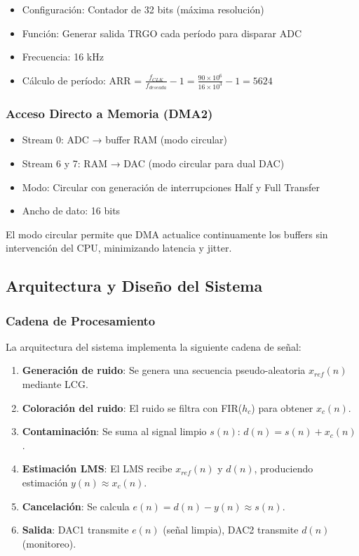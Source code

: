 \documentclass[12pt]{article}
\begin{document}
				\begin{itemize}
					\item Configuración: Contador de 32 bits (máxima resolución)
					\item Función: Generar salida TRGO cada período para disparar ADC
					\item Frecuencia: 16 kHz
					\item Cálculo de período: ARR = $\frac{f_{CLK}}{f_{deseada}} - 1 = \frac{90 \times 10^6}{16 \times 10^3} - 1 = 5624$
				\end{itemize}

			\subsubsection{Acceso Directo a Memoria (DMA2)}

				\begin{itemize}
					\item Stream 0: ADC → buffer RAM (modo circular)
					\item Stream 6 y 7: RAM → DAC (modo circular para dual DAC)
					\item Modo: Circular con generación de interrupciones Half y Full Transfer
					\item Ancho de dato: 16 bits
				\end{itemize}

				El modo circular permite que DMA actualice continuamente los buffers sin intervención del CPU, minimizando latencia y jitter.

		\subsection{Arquitectura y Diseño del Sistema}

			\subsubsection{Cadena de Procesamiento}

				La arquitectura del sistema implementa la siguiente cadena de señal:

				\begin{enumerate}
					\item \textbf{Generación de ruido}: Se genera una secuencia pseudo-aleatoria $x_{ref}(n)$ mediante LCG.
					\item \textbf{Coloración del ruido}: El ruido se filtra con FIR($h_c$) para obtener $x_c(n)$.
					\item \textbf{Contaminación}: Se suma al signal limpio $s(n)$: $d(n) = s(n) + x_c(n)$.
					\item \textbf{Estimación LMS}: El LMS recibe $x_{ref}(n)$ y $d(n)$, produciendo estimación $y(n) \approx x_c(n)$.
					\item \textbf{Cancelación}: Se calcula $e(n) = d(n) - y(n) \approx s(n)$.
					\item \textbf{Salida}: DAC1 transmite $e(n)$ (señal limpia), DAC2 transmite $d(n)$ (monitoreo).
				\end{enumerate}
\end{document}
